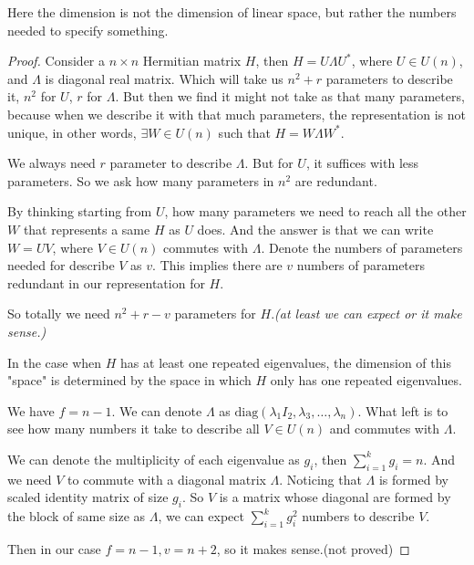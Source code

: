 Here the dimension is not the dimension of linear space, but rather the numbers needed to specify something.

\begin{proof}\label{eigenvalue deformation}
    Consider a $n\times n$ Hermitian matrix $H$, then $H=U\Lambda U^*$, where $U\in U(n)$, and $\Lambda$ is diagonal real matrix. Which will take us $n^2+r$ parameters to describe it, $n^2$ for $U$, $r$ for $\Lambda$. 
    But then we find it might not take as that many parameters, because when we describe it with that much parameters, the representation is not unique, in other words, $\exists W\in U(n)$ such that $H=W\Lambda W^*$. 
    
    We always need $r$ parameter to describe $\Lambda$. But for $U$, it suffices with less parameters. So we ask how many parameters in $n^2$ are redundant. 
    
    By thinking starting from $U$, how many parameters we need to reach all the other $W$ that represents a same $H$ as $U$ does. 
    And the answer is that we can write $W=UV$, where $V\in U(n)$ commutes with $\Lambda$. Denote the numbers of parameters needed for describe $V$ as $v$.
    This implies there are $v $ numbers of parameters redundant in our representation for $H$. 

    So totally we need $n^2+r-v$ parameters for $H$.\textit{(at least we can expect or it make sense.)}

    In the case when $H$ has at least one repeated eigenvalues, the dimension of this "space" is determined by the space in which $H$ only has one repeated eigenvalues.
    
    We have $f=n-1$. We can denote $\Lambda$ as $\mathrm{diag}(\lambda_1 I_2, \lambda_3,\dots,\lambda_n)$. What left is to see how many numbers it take to describe all $V\in U(n)$ and commutes with $\Lambda$.

    We can denote the multiplicity of each eigenvalue as $g_i$, then $\sum_{i=1}^k g_i = n$. And we need $V$ to commute with a diagonal matrix $\Lambda$. Noticing that $\Lambda$ is formed by scaled identity matrix of size $g_{i}$. So $V$ is a matrix whose diagonal are formed by the block of same size as $\Lambda$, we can expect $\sum_{i=1}^k g_{i}^2$ numbers to describe $V$.

    Then in our case $f=n-1,v=n+2$, so it makes sense.(not proved)
\end{proof}

